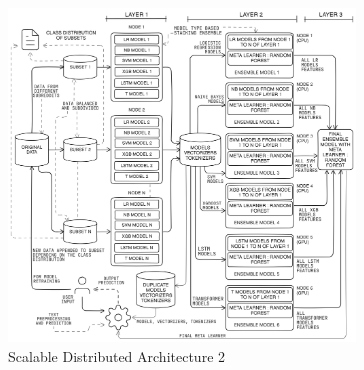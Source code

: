 \pagebreak

\begin{figure}[h!]  
    \centering
    \includegraphics[width=0.82\textwidth]{Images/Distributed2.png}  
    \caption{Scalable Distributed Architecture 2}
    \label{lstm archi}  %
\end{figure}

